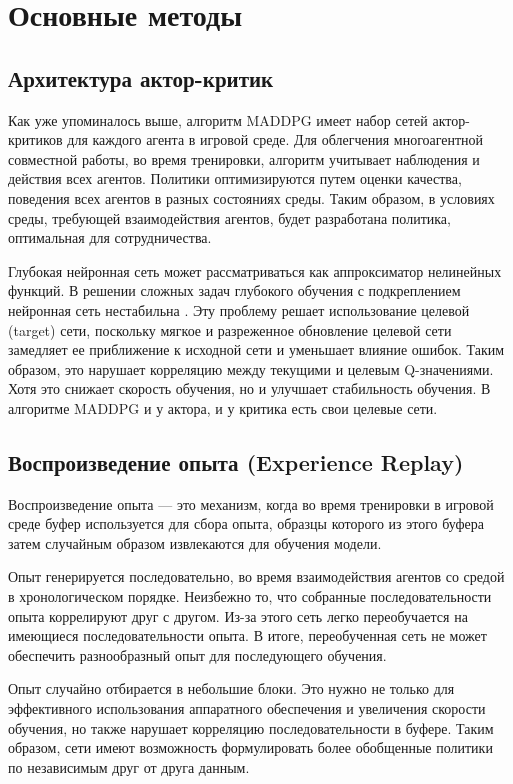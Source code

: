 \section{Основные методы}

\subsection{Архитектура актор-критик}

Как уже упоминалось выше, алгоритм MADDPG имеет набор сетей актор-критиков для каждого агента в игровой среде. Для облегчения многоагентной совместной работы, во время тренировки, алгоритм учитывает наблюдения и действия всех агентов. Политики оптимизируются путем оценки качества, поведения всех агентов в разных состояниях среды. Таким образом, в условиях среды, требующей взаимодействия агентов, будет разработана политика, оптимальная для сотрудничества.

Глубокая нейронная сеть может рассматриваться как аппроксиматор нелинейных функций. В решении сложных задач глубокого обучения с подкреплением нейронная сеть нестабильна \cite{lillicrap2015continuous}. Эту проблему решает использование целевой (target) сети, поскольку мягкое и разреженное обновление целевой сети замедляет ее приближение к исходной сети и уменьшает влияние ошибок. Таким образом, это нарушает корреляцию между текущими и целевым Q-значениями. Хотя это снижает скорость обучения, но и улучшает стабильность обучения. В алгоритме MADDPG и у актора, и у критика есть свои целевые сети.

\subsection{Воспроизведение опыта (Experience Replay)}

Воспроизведение опыта — это механизм, когда во время тренировки в игровой среде буфер используется для сбора опыта, образцы которого из этого буфера затем случайным образом извлекаются для обучения модели.

Опыт генерируется последовательно, во время взаимодействия агентов со средой в хронологическом порядке. Неизбежно то, что собранные последовательности опыта коррелируют друг с другом. Из-за этого сеть легко переобучается на имеющиеся последовательности опыта. В итоге, переобученная сеть не может обеспечить разнообразный опыт для последующего обучения.

Опыт случайно отбирается в небольшие блоки. Это нужно не только для эффективного использования аппаратного обеспечения и увеличения скорости обучения, но также нарушает корреляцию последовательности в буфере. Таким образом, сети имеют возможность формулировать более обобщенные политики по независимым друг от друга данным.

